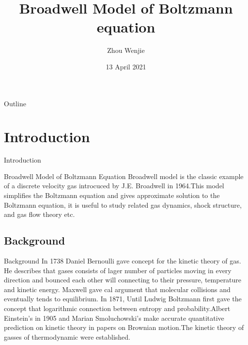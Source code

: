 \documentclass[12pt,xcolor={table,dvipsnames},t]{beamer}
\title[]{Broadwell Model of Boltzmann equation}
\subtitle{}
\author{Zhou Wenjie}
\institute{Science/Mathematics}
\date{13 April 2021}
\begin{document}
\begin{frame}
  \titlepage
\end{frame}

\begin{frame}{Outline}
 \tableofcontents
\end{frame}



\section{Introduction}

\begin{frame}{Introduction}


\begin{block}{Broadwell Model of Boltzmann Equation}
Broadwell model is the classic example of a discrete velocity gas introcuced by J.E. Broadwell in 1964.This model simplifies the Boltzmann equation and gives approximate solution to the Boltzmann equation, it is useful to study related gas dynamics, shock structure, and gas flow theory etc.
\end{block}

\end{frame}


\subsection{Background}
\begin{frame}{Background}
In 1738 Daniel Bernoulli gave concept for the kinetic theory of gas. He describes that gases consists of lager number of particles moving in every direction and bounced each other will connecting to their pressure, temperature and kinetic energy. Maxwell gave cal argument that molecular collisions and eventually tends to equilibrium. In 1871, Until Ludwig Boltzmann first gave the concept that logarithmic connection between entropy and probability.Albert Einstein's in 1905 and Marian Smoluchowski's make accurate quantitative prediction on kinetic theory in papers on Brownian motion.The kinetic theory of gasses of thermodynamic were established.
\end{frame}

\end{document}
